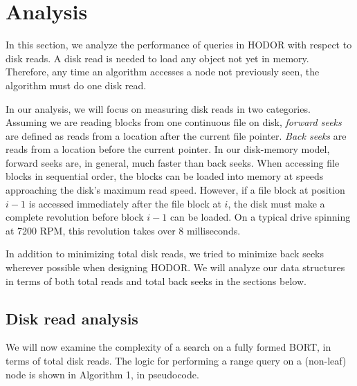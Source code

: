 \documentclass[11pt, oneside]{article}
\begin{document}
\section{Analysis}

In this section, we analyze the performance of queries in HODOR with respect to
disk reads. A disk read is needed to load any object not yet in memory.
Therefore, any time an algorithm accesses a node not previously seen, the
algorithm must do one disk read.

In our analysis, we will focus on measuring disk reads in two categories.
Assuming we are reading blocks from one continuous file on disk,
\textit{forward seeks} are defined as reads from a location after the current
file pointer. \textit{Back seeks} are reads from a location before the current
pointer. In our disk-memory model, forward seeks are, in general, much faster
than back seeks. When accessing file blocks in sequential order, the blocks can
be loaded into memory at speeds approaching the disk's maximum read speed.
However, if a file block at position $i-1$ is accessed immediately after the
file block at $i$, the disk must make a complete revolution before block $i-1$
can be loaded. On a typical drive spinning at 7200 RPM, this revolution takes
over 8 milliseconds.

In addition to minimizing total disk reads, we tried to minimize back seeks
wherever possible when designing HODOR. We will analyze our data structures in
terms of both total reads and total back seeks in the sections below.

\subsection{Disk read analysis}

We will now examine the complexity of a search on a fully formed BORT, in terms
of total disk reads. The logic for performing a range query on a (non-leaf) node
is shown in Algorithm 1, in pseudocode.
\end{document}
